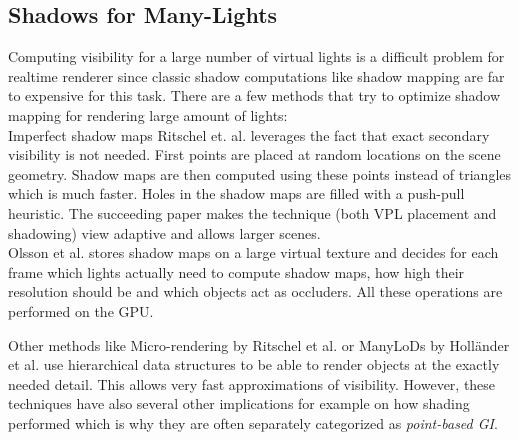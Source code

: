 \documentclass[thesis.tex]{subfiles}
\begin{document}
\subsection{Shadows for Many-Lights}
Computing visibility for a large number of virtual lights is a difficult problem for realtime renderer since classic shadow computations like shadow mapping are far to expensive for this task.
There are a few methods that try to optimize shadow mapping for rendering large amount of lights:
\\
Imperfect shadow maps Ritschel et. al. \cite{bib:imperfectshadowmaps} leverages the fact that exact secondary visibility is not needed.
First points are placed at random locations on the scene geometry.
Shadow maps are then computed using these points instead of triangles which is much faster.
Holes in the shadow maps are filled with a push-pull heuristic.
The succeeding paper \cite{bib:imperfectshadowmaps:adapative} makes the technique (both VPL placement and shadowing) view adaptive and allows larger scenes.
\\
Olsson et al. \cite{bib:virtualshadowmaps} stores shadow maps on a large virtual texture and decides for each frame which lights actually need to compute shadow maps, how high their resolution should be and which objects act as occluders.
All these operations are performed on the GPU.

Other methods like Micro-rendering by Ritschel et al. \cite{bib:microrendering} or ManyLoDs by Holländer et al. \cite{bib:manylods} use hierarchical data structures to be able to render objects at the exactly needed detail.
This allows very fast approximations of visibility.
However, these techniques have also several other implications for example on how shading performed which is why they are often separately categorized as \emph{point-based GI}.

%
%
\end{document}
